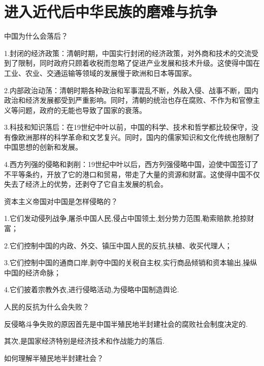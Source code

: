 \documentclass[lang=cn,10pt]{elegantbook}
\begin{document}
	\chapter{进入近代后中华民族的磨难与抗争}
	\begin{example}
		中国为什么会落后？
	\end{example}
	\begin{solution}
		1.封闭的经济政策：清朝时期，中国实行封闭的经济政策，对外商和技术的交流受到了限制，同时政府只顾着收税而忽略了促进产业发展和技术升级。这使得中国在工业、农业、交通运输等领域的发展慢于欧洲和日本等国家。
		
		2.内部政治动荡：清朝时期各种政治和军事混乱不断，外敌入侵、战事不断，国内政治和经济发展都受到严重影响。同时，清朝的统治也存在腐败、不作为和官僚主义等问题，政府的无能也导致了国家的衰落。
		
		3.科技和知识落后：在19世纪中叶以前，中国的科学、技术和哲学都比较保守，没有像欧洲那样的科学革命和文艺复兴。同时，国内的儒家知识和文化传统也限制了中国思想的创新和发展。
		
		4.西方列强的侵略和剥削：19世纪中叶以后，西方列强侵略中国，迫使中国签订了不平等条约，开放了它的港口和贸易，带走了大量的资源和财富。这使得中国不仅失去了经济上的优势，还剥夺了它自主发展的机会。
	\end{solution}
	\begin{example}
		资本主义帝国对中国是怎样侵略的？
	\end{example}
	\begin{solution}
		1.它们发动侵列战争,屠杀中国人民,侵占中国领土,划分势力范围,勒索赔款,抢掠财富；
		
		2.它们控制中国的内政、外交、镇压中国人民的反抗,扶植、收买代理人；
		
		3.它们控制中国的通商口岸,剥夺中国的关税自主权,实行商品倾销和资本输出,操纵中国的经济命脉；
		
		4.它们披着宗教外衣,进行侵略活动,为侵略中国制造舆论.
	\end{solution}
	\begin{example}
		人民的反抗为什么会失败？
	\end{example}
	\begin{solution}
		
		反侵略斗争失败的原因首先是中国半殖民地半封建社会的腐败社会制度决定的.
		
		其次,是国家经济特别是经济技术和作战能力的落后.
	\end{solution}
	\begin{example}
		如何理解半殖民地半封建社会？
	\end{example}
\end{document}
